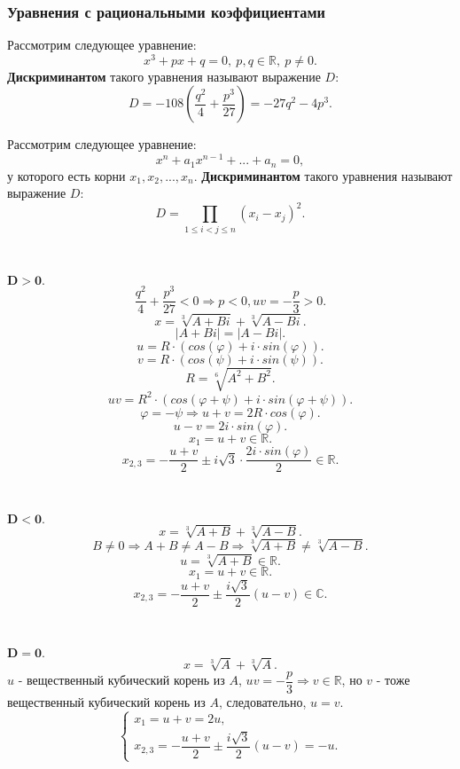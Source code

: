 \documentclass[12pt]{article}
\begin{document}
\subsubsection{Уравнения с рациональными коэффициентами}
\begin{defn}
Рассмотрим следующее уравнение: $$x^3 + px + q = 0,~p,q \in \mathbb{R},~p \neq 0.$$
\textbf{Дискриминантом} такого уравнения называют выражение $D$: $$D = -108(\dfrac{q^2}{4} + \dfrac{p^3}{27}) = -27q^2 - 4p^3.$$
\end{defn}

\begin{defn}
Рассмотрим следующее уравнение: $$x^n + a_1x^{n-1} + ... + a_n = 0,$$
у которого есть корни $x_1, x_2, ..., x_n$.
\textbf{Дискриминантом} такого уравнения называют выражение $D$: $$D = \prod_{1 \leq i < j \leq n }(x_i - x_j)^2.$$
\end{defn}

~\

$\pmb{D > 0.}$
$$\dfrac{q^2}{4} + \dfrac{p^3}{27} < 0 \Rightarrow p < 0, uv = -\dfrac{p}{3} > 0.$$
$$x = \sqrt[3]{A + Bi} + \sqrt[3]{A - Bi}.$$
$$|A + Bi| = |A - Bi|.$$
$$u = R \cdot (cos(\varphi) + i \cdot sin(\varphi)).$$
$$v = R \cdot (cos(\psi) + i \cdot sin(\psi)).$$
$$R = \sqrt[6]{A^2 + B^2}.$$
$$uv = R^2 \cdot (cos(\varphi + \psi) + i \cdot sin(\varphi + \psi)).$$
$$\varphi = -\psi \Rightarrow u + v = 2R \cdot cos(\varphi).$$
$$u - v = 2i \cdot sin(\varphi).$$
$$x_1 = u + v \in \mathbb{R}.$$
$$x_{2,3} = -\dfrac{u + v}{2} \pm i \sqrt{3} \cdot \dfrac{2i \cdot sin(\varphi)}{2} \in \mathbb{R}.$$

~\

$\pmb{D < 0.}$
$$x = \sqrt[3]{A + B}  + \sqrt[3]{A - B}.$$
$$B \neq 0 \Rightarrow A + B \neq A - B \Rightarrow \sqrt[3]{A + B} \neq \sqrt[3]{A - B}.$$
$$u = \sqrt[3]{A + B} \in \mathbb{R}.$$
$$x_1 = u + v \in \mathbb{R}.$$
$$x_{2, 3} = -\dfrac{u + v}{2} \pm \dfrac{i\sqrt{3}}{2}(u - v) \in \mathbb{C}.$$

~\

$\pmb{D = 0.}$
$$x = \sqrt[3]{A} + \sqrt[3]{A}.$$
\indent$u$ - вещественный кубический корень из $A$, $uv = -\dfrac{p}{3} \Rightarrow v \in \mathbb{R}$, но $v$ - тоже вещественный кубический корень из $A$, следовательно, $u = v$.
$$\begin{cases}
x_1 = u + v = 2u, \\
x_{2,3} = -\dfrac{u + v}{2} \pm \dfrac{i\sqrt{3}}{2}(u - v) = -u.
\end{cases}$$
\end{document}
